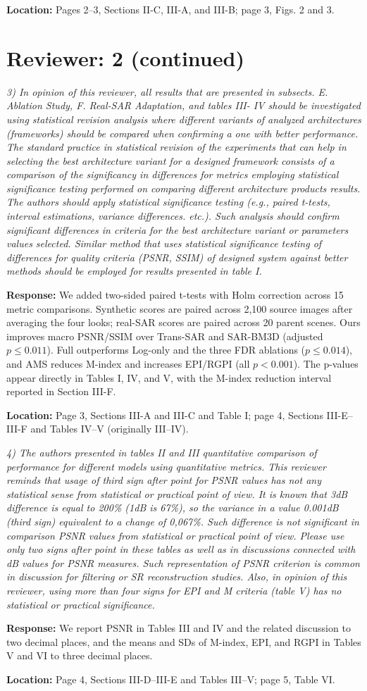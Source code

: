 \documentclass[11pt,letterpaper]{article}
\begin{document}
\textbf{Location:} Pages 2--3, Sections II-C, III-A, and III-B; page 3, Figs. 2 and 3.

\clearpage
\section*{Reviewer: 2 (continued)}
\textit{3) In opinion of this reviewer, all results that are presented in subsects. E. Ablation Study, F. Real-SAR Adaptation, and tables III- IV should be investigated using statistical revision analysis where different variants of analyzed architectures (frameworks) should be compared when confirming a one with better performance. The standard practice in statistical revision of the experiments that can help in selecting the best architecture variant for a designed framework consists of a comparison of the significancy in differences for metrics employing statistical significance testing performed on comparing different architecture products\textasciiacute{} results. The authors should apply statistical significance testing (e.g., paired t-tests, interval estimations, variance differences. etc.). Such analysis should confirm significant differences in criteria for the best architecture variant or parameters\textasciiacute{} values selected. Similar method that uses statistical significance testing of differences for quality criteria (PSNR, SSIM) of designed system against better methods should be employed for results presented in table I.}

\medskip
\textbf{Response:} We added two-sided paired t-tests with Holm correction across 15 metric comparisons. Synthetic scores are paired across 2,100 source images after averaging the four looks; real-SAR scores are paired across 20 parent scenes. Ours improves macro PSNR/SSIM over Trans-SAR and SAR-BM3D (adjusted $p\leq0.011$). Full outperforms Log-only and the three FDR ablations ($p\leq0.014$), and AMS reduces M-index and increases EPI/RGPI (all $p<0.001$). The p-values appear directly in Tables I, IV, and V, with the M-index reduction interval reported in Section III-F.

\textbf{Location:} Page 3, Sections III-A and III-C and Table I; page 4, Sections III-E--III-F and Tables IV--V (originally III--IV).

\textit{4) The authors presented in tables II and III quantitative comparison of performance for different models using quantitative metrics. This reviewer reminds that usage of third sign after point for PSNR values has not any statistical sense from statistical or practical point of view. It is known that 3dB difference is equal to 200\% (1dB is 67\%), so the variance in a value 0.001dB (third sign) equivalent to a change of 0,067\%. Such difference is not significant in comparison PSNR values from statistical or practical point of view. Please use only two signs after point in these tables as well as in discussions connected with dB values for PSNR measures. Such representation of PSNR criterion is common in discussion for filtering or SR reconstruction studies. Also, in opinion of this reviewer, using more than four signs for EPI and M criteria (table V) has no statistical or practical significance.}

\medskip
\textbf{Response:} We report PSNR in Tables III and IV and the related discussion to two decimal places, and the means and SDs of M-index, EPI, and RGPI in Tables V and VI to three decimal places.

\textbf{Location:} Page 4, Sections III-D--III-E and Tables III--V; page 5, Table VI.
\end{document}
